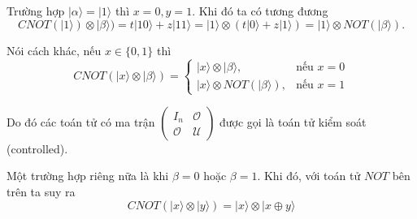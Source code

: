 Trường hợp $\lvert \alpha \rangle = \lvert 1 \rangle$ thì $x = 0, y = 1$. Khi đó ta có tương đương \[ CNOT (\lvert 1 \rangle) \otimes \lvert \beta \rangle) = t \lvert 10 \rangle + z \lvert 11 \rangle = \lvert 1 \rangle \otimes (t \lvert 0 \rangle + z \lvert 1 \rangle) = \lvert 1 \rangle \otimes NOT(\lvert \beta \rangle). \]

Nói cách khác, nếu $x \in \{0, 1\}$ thì \[ CNOT (\lvert x \rangle \otimes \lvert \beta \rangle) = \begin{cases}
    \lvert x \rangle \otimes \lvert \beta \rangle, & \text{nếu } x = 0 \\ \lvert x \rangle \otimes NOT(\lvert \beta \rangle), & \text{nếu } x = 1
\end{cases} \]

Do đó các toán tử có ma trận $\begin{pmatrix}
    I_n & \mathcal{O} \\ \mathcal{O} & \mathcal{U}
\end{pmatrix}$ được gọi là toán tử kiểm soát (controlled).

Một trường hợp riêng nữa là khi $\beta = 0$ hoặc $\beta = 1$. Khi đó, với toán tử $NOT$ bên trên ta suy ra \[ CNOT (\lvert x \rangle \otimes \lvert y \rangle) = \lvert x \rangle \otimes \lvert x \oplus y \rangle \]
